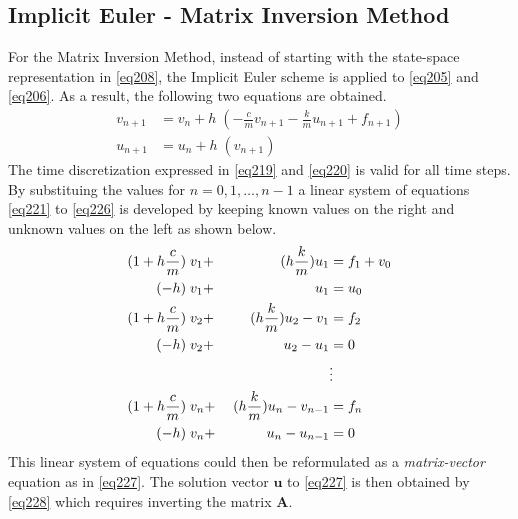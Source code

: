 \subsection{Implicit Euler - Matrix Inversion Method} 
For the Matrix Inversion Method, instead of starting with the state-space representation in \cref{eq208}, the Implicit Euler scheme is applied to \cref{eq205} and \cref{eq206}. As a result, the following two equations are obtained.
\begin{align}
v_{n+1} &= v_{n} + h \; (-\frac{c}{m} v_{n+1} - \frac{k}{m} u_{n+1} + f_{n+1})\label{eq219}\\
u_{n+1} &= u_{n} + h \; (v_{n+1})\label{eq220}
\end{align}
The time discretization expressed in \cref{eq219} and \cref{eq220} is valid for all time steps. By substituing the values for $n = 0, 1,\hdots, n-1$ a linear system of equations \cref{eq221} to \cref{eq226} is developed by keeping known values on the right and unknown values on the left as shown below. 
\begin{alignat}{3}
(1 + h\frac{c}{m})\; &v_{1} +& \;(h\frac{k}{m})u_{1} &= f_{1} + v_{0}\label{eq221}\\
(-h)\; &v_{1} +& u_{1} &= u_{0} \label{eq222}\\
(1 + h\frac{c}{m})\; &v_{2} +& \;(h\frac{k}{m})u_{2} - v_{1} &= f_{2} \label{eq223} \\
(-h)\; &v_{2} +& u_{2} - u_{1} &= 0 \label{eq224}\\
& & &\vdots\notag\\
(1 + h\frac{c}{m})\; &v_{n} +& \;(h\frac{k}{m})u_{n} - v_{n-1} &= f_{n} \label{eq225}\\
(-h)\; &v_{n} +& u_{n} - u_{n-1} &= 0 \label{eq226}
\end{alignat}
This linear system of equations  could then be reformulated as a \emph{matrix-vector} equation as in \cref{eq227}. The solution vector $\mathbf{u}$ to \cref{eq227} is then obtained by \cref{eq228} which requires inverting the matrix $\mathbf{A}$. 
